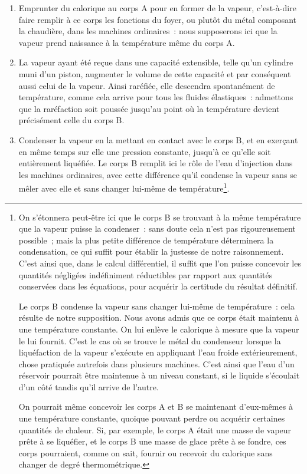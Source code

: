 \documentclass[french,twoside]{book} %
\begin{document}
\begin{enumerate}[itemsep=0pt,topsep=0pt,partopsep=0pt,parskip=0pt]
\item Emprunter du calorique au corps A pour en former de la vapeur, c’est-à-dire faire remplir à ce corps les fonctions du foyer, ou plutôt du métal composant la chaudière, dans les machines ordinaires : nous supposerons ici que la vapeur prend naissance à la température même du corps A.
\item La vapeur ayant été reçue dans une capacité extensible, telle qu’un cylindre muni d’un piston, augmenter le volume de cette capacité et par conséquent aussi celui de la vapeur. Ainsi raréfiée, elle descendra spontanément de température, comme cela arrive pour tous les fluides élastiques : admettons que la raréfaction soit poussée jusqu’au point où la température devient précisément celle du corps B.
\item Condenser la vapeur en la mettant en contact avec le corps B, et en exerçant en même temps sur elle une pression constante, jusqu’à ce qu’elle soit entièrement liquéfiée. Le corps B remplit ici le rôle de l’eau d’injection dans les machines ordinaires, avec cette différence qu’il condense la vapeur sans se mêler avec elle et sans changer lui-même de température\footnote{ \noindent On s’étonnera peut-être ici que le corps B se trouvant à la même température que la vapeur puisse la condenser : sans doute cela n’est pas rigoureusement possible ; mais la plus petite différence de température déterminera la condensation, ce qui suffit pour établir la justesse de notre raisonnement. C’est ainsi que, dans le calcul différentiel, il suffit que l’on puisse concevoir les quantités négligées indéfiniment réductibles par rapport aux quantités conservées dans les équations, pour acquérir la certitude du résultat définitif.\par
 Le corps B condense la vapeur sans changer lui-même de température : cela résulte de notre supposition. Nous avons admis que ce corps était maintenu à une température constante. On lui enlève le calorique à mesure que la vapeur le lui fournit. C’est le cas où se trouve le métal du condenseur lorsque la liquéfaction de la vapeur s’exécute en appliquant l’eau froide extérieurement, chose pratiquée autrefois dans plusieurs machines. C’est ainsi que l’eau d’un réservoir pourrait être maintenue à un niveau constant, si le liquide s’écoulait d’un côté tandis qu’il arrive de l’autre.\par
 On pourrait même concevoir les corps A et B se maintenant d’eux-mêmes à une température constante, quoique pouvant perdre ou acquérir certaines quantités de chaleur. Si, par exemple, le corps A était une masse de vapeur prête à se liquéfier, et le corps B une masse de glace prête à se fondre, ces corps pourraient, comme on sait, fournir ou recevoir du calorique sans changer de degré thermométrique.
}.
\end{enumerate}
\end{document}
